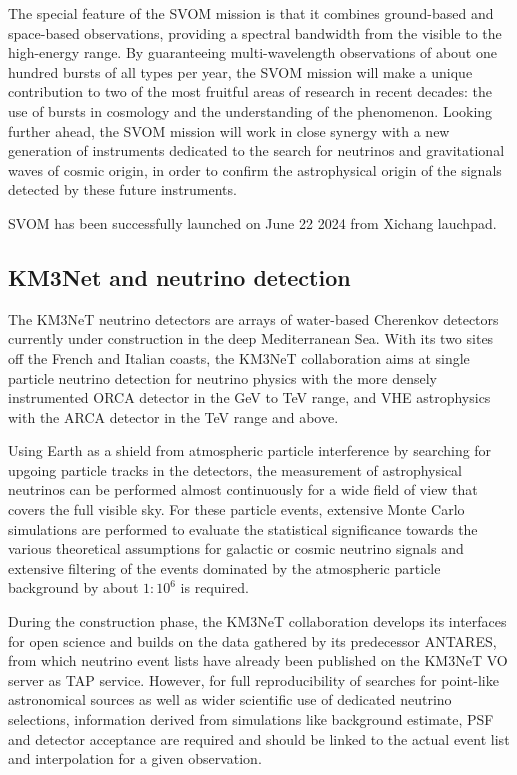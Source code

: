 \documentclass[11pt,a4paper]{ivoa}
\begin{document}
The special feature of the SVOM mission is that it combines ground-based and space-based observations,
providing a spectral bandwidth from the visible to the high-energy range. By guaranteeing multi-wavelength
observations of about one hundred bursts of all types per year, the SVOM mission will make a unique contribution
to two of the most fruitful areas of research in recent decades: the use of bursts in cosmology and the understanding
of the phenomenon. Looking further ahead, the SVOM mission will work in close synergy with a new generation of
instruments dedicated to the search for neutrinos and gravitational waves of cosmic origin, in order to confirm
the astrophysical origin of the signals detected by these future instruments.

SVOM has been successfully launched on June 22 2024 from  Xichang lauchpad.


\subsection{KM3Net and neutrino detection}

The KM3NeT neutrino detectors are arrays of water-based Cherenkov detectors currently under construction in the deep
Mediterranean Sea. With its two sites off the French and Italian coasts, the KM3NeT collaboration aims at single particle
neutrino detection for neutrino physics with the more densely instrumented ORCA detector in the GeV to TeV range, and
VHE astrophysics with the ARCA detector in the TeV range and above.

Using Earth as a shield from atmospheric particle interference by searching for upgoing particle tracks in the detectors,
the measurement of astrophysical neutrinos can be performed almost continuously for a wide field of view that covers the
full visible sky. For these particle events, extensive Monte Carlo simulations are performed to evaluate the
statistical significance towards the various theoretical assumptions for galactic or cosmic neutrino signals and extensive filtering of the events dominated by the atmospheric particle background by about $1:10^{6}$ is required.

During the construction phase, the KM3NeT collaboration develops its interfaces for open science and builds on the data
gathered by its predecessor ANTARES, from which neutrino event lists have already been published on the KM3NeT VO server
as TAP service. However, for full reproducibility of searches for point-like astronomical sources as well as wider scientific use of dedicated neutrino selections,
information derived from simulations like background estimate, PSF and detector acceptance are required and should be linked
to the actual event list and interpolation for a given observation.
\end{document}
